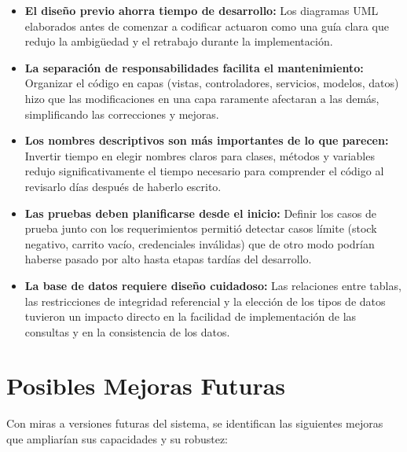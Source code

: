 \documentclass[12pt,a4paper]{report}
\begin{document}
\begin{itemize}
    \item \textbf{El diseño previo ahorra tiempo de desarrollo:} Los diagramas UML elaborados antes de comenzar a codificar actuaron como una guía clara que redujo la ambigüedad y el retrabajo durante la implementación.
    \item \textbf{La separación de responsabilidades facilita el mantenimiento:} Organizar el código en capas (vistas, controladores, servicios, modelos, datos) hizo que las modificaciones en una capa raramente afectaran a las demás, simplificando las correcciones y mejoras.
    \item \textbf{Los nombres descriptivos son más importantes de lo que parecen:} Invertir tiempo en elegir nombres claros para clases, métodos y variables redujo significativamente el tiempo necesario para comprender el código al revisarlo días después de haberlo escrito.
    \item \textbf{Las pruebas deben planificarse desde el inicio:} Definir los casos de prueba junto con los requerimientos permitió detectar casos límite (stock negativo, carrito vacío, credenciales inválidas) que de otro modo podrían haberse pasado por alto hasta etapas tardías del desarrollo.
    \item \textbf{La base de datos requiere diseño cuidadoso:} Las relaciones entre tablas, las restricciones de integridad referencial y la elección de los tipos de datos tuvieron un impacto directo en la facilidad de implementación de las consultas y en la consistencia de los datos.
\end{itemize}

\section{Posibles Mejoras Futuras}

Con miras a versiones futuras del sistema, se identifican las siguientes mejoras que ampliarían sus capacidades y su robustez:
\end{document}
